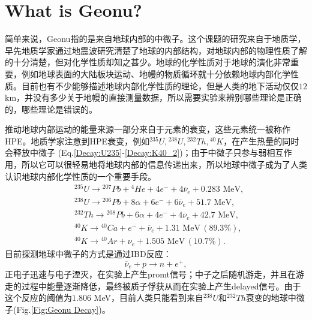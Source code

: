 		\section{What is Geonu?}
			简单来说，Geonu指的是来自地球内部的中微子。这个课题的研究来自于地质学，早先地质学家通过地震波研究清楚了地球的内部结构，对地球内部的物理性质了解的十分清楚，但对化学性质却知之甚少。地球的化学性质对于地球的演化非常重要，例如地球表面的大陆板块运动、地幔的物质循环就十分依赖地球内部化学性质。目前也有不少能够描述地球内部化学性质的理论，但是人类的地下活动仅仅$12$ km，并没有多少关于地幔的直接测量数据，所以需要实验来辨别哪些理论是正确的，哪些理论是错误的。\par
			推动地球内部运动的能量来源一部分来自于元素的衰变，这些元素统一被称作HPE。地质学家注意到HPE衰变，例如${}^{235}U, {}^{238}U, {}^{232}Th, {}^{40}K$，在产生热量的同时会释放中微子\cite{fiorentini2007geo} (Eq.\ref{Decay:U235}-\ref{Decay:K40_2})；由于中微子只参与弱相互作用，所以它可以很轻易地将地球内部的信息传递出来，所以地球中微子成为了人类认识地球内部化学性质的一个重要手段。
				\begin{align}
					&{}^{235}U \longrightarrow {}^{207}Pb + {}^{4}He + 4e^- + 4\overline{\nu}_e + 0.283 \text{ MeV},
					\label{Decay:U235}\\
					&{}^{238}U \longrightarrow {}^{206}Pb + 8\alpha + 6e^- + 6\overline{\nu}_e + 51.7 \text{ MeV},
					\label{Decay:U238}\\
					&{}^{232}Th \longrightarrow {}^{208}Pb + 6\alpha + 4e^- + 4\overline{\nu}_e + 42.7 \text{ MeV},
					\label{Decay:Th232}\\
					&{}^{40}K \longrightarrow {}^{40}Ca + e^- + \overline{\nu}_e + 1.31 \text{ MeV} \,(89.3\%),
					\label{Decay:K40_1}\\
					&{}^{40}K \longrightarrow {}^{40}Ar + \nu_e + 1.505 \text{ MeV} \,(10.7\%).
					\label{Decay:K40_2}
				\end{align}
			目前探测地球中微子的方式是通过IBD反应：
				\begin{equation}
					\overline{\nu}_e + p \longrightarrow n + e^+,
				\end{equation}
			正电子迅速与电子湮灭，在实验上产生promt信号；中子之后随机游走，并且在游走的过程中能量逐渐降低，最终被质子俘获从而在实验上产生delayed信号。由于这个反应的阈值为$1.806$ MeV，目前人类只能看到来自${}^{238}U$和${}^{232}Th$衰变的地球中微子(Fig.\ref{Fig:Geonu Decay})。
